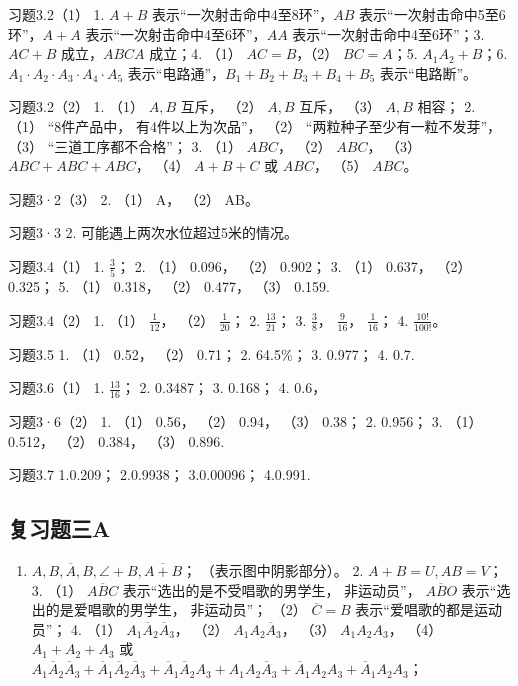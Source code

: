 习题3.2（1） 1. \(A + B\) 表示``一次射击命中4至8环''，\(AB\)
表示``一次射击命中5至6环''，\(A + A\) 表示``一次射击命中4至6环''，\(AA\)
表示``一次射击命中4至6环''；3. \(AC + B\) 成立，\(ABC A\) 成立；4. （1）
\(AC = B\)，（2） \(BC = A\)；5. \(A_{1}A_{2} + B\)；6.
\(A_{1} \cdot A_{2} \cdot A_{3} \cdot A_{4} \cdot A_{5}\)
表示``电路通''，\(B_{1} + B_{2} + B_{3} + B_{4} + B_{5}\)
表示``电路断''。

习题3.2（2） 1. （1） \(A, B\) 互斥， （2） \(A, B\) 互斥， （3）
\(A, B\) 相容； 2. （1） ``8件产品中， 有4件以上为次品''， （2）
``两粒种子至少有一粒不发芽''， （3） ``三道工序都不合格''； 3. （1）
\(ABC\)， （2） \(ABC\)， （3） \(ABC + ABC + ABC\)， （4）
\(A + B + C\) 或 \(ABC\)， （5） \(ABC\)。

习题3·2（3） 2. （1） A， （2） AB。

习题3·3 2. 可能遇上两次水位超过5米的情况。

习题3.4（1） 1. \(\frac{3}{5}\)； 2. （1） 0.096， （2） 0.902； 3.
（1） 0.637， （2） 0.325； 5. （1） 0.318， （2） 0.477， （3） 0.159.

习题3.4（2） 1. （1） \(\frac{1}{12}\)， （2） \(\frac{1}{20}\)； 2.
\(\frac{13}{21}\)； 3. \(\frac{3}{8}\)， \(\frac{9}{16}\)，
\(\frac{1}{16}\)； 4. \(\frac{10!}{100!}\)。

习题3.5 1. （1） 0.52， （2） 0.71； 2. 64.5\%； 3. 0.977； 4. 0.7.

习题3.6（1） 1. \(\frac{13}{16}\)； 2. 0.3487； 3. 0.168； 4. 0.6，

习题3·6（2） 1. （1） 0.56， （2） 0.94， （3） 0.38； 2. 0.956； 3.
（1） 0.512， （2） 0.384， （3） 0.896.

习题3.7 1.0.209； 2.0.9938； 3.0.00096； 4.0.991.

\subsection{复习题三A}

\begin{enumerate}
\item
  \(A, B, \overline{A}, B, \angle + B, \overline{A + B}\)；
  （表示图中阴影部分）。 2. \(A + B = U, AB = V\)； 3. （1）
  \(\overline{ABC}\) 表示``选出的是不受唱歌的男学生， 非运动员''，
  \(\overline{ABO}\) 表示``选出的是爱唱歌的男学生， 非运动员''； （2）
  \(\overline{C} = B\) 表示``爱唱歌的都是运动员''； 4. （1）
  \(A_{1}\overline{A}_{2}\overline{A}_{3}\)， （2）
  \(A_{1}A_{2}\overline{A}_{3}\)， （3） \(A_{1}A_{2}A_{3}\)， （4）
  \(A_{1} + A_{2} + A_{3}\) 或
  \(A_{1}\overline{A}_{2}\overline{A}_{3} + \overline{A}_{1}\overline{A}_{2}\overline{A}_{3} + \overline{A}_{1}\overline{A}_{2}A_{3} + A_{1}A_{2}\overline{A}_{3} + \overline{A}_{1}A_{2}A_{3} + \overline{A}_{1}A_{2}A_{3}\)；
\end{enumerate}

